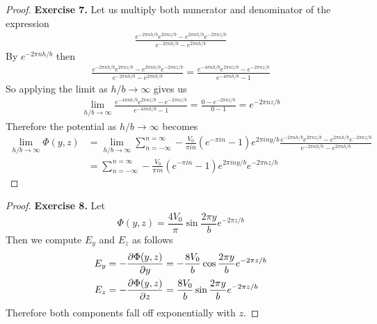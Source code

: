 \documentclass[11pt]{article}
\theoremstyle{definition}
\begin{document}
\cleardoublepage
\begin{proof}{\textbf{Exercise 7.}}
Let us multiply both numerator and denominator of the expression
\begin{align*}
    \frac{e^{-2\pi nh/b}e^{2\pi nz/b} - e^{2\pi nh/b}e^{-2\pi nz/b}}
    {e^{-2\pi nh/b}-e^{2\pi nh/b}}
\end{align*}
By $e^{-2\pi nh/b}$ then
\begin{align*}
    \frac{e^{-2\pi nh/b}e^{2\pi nz/b} - e^{2\pi nh/b}e^{-2\pi nz/b}}
    {e^{-2\pi nh/b}-e^{2\pi nh/b}} = 
    \frac{e^{-4\pi nh/b}e^{2\pi nz/b} - e^{-2\pi nz/b}}
    {e^{-4\pi nh/b}-1}
\end{align*}
So applying the limit as $h/b \to \infty$ gives us
\begin{align*}
    \lim_{h/b \to \infty} 
    \frac{e^{-4\pi nh/b}e^{2\pi nz/b} - e^{-2\pi nz/b}}
    {e^{-4\pi nh/b}-1} = \frac{0- e^{-2\pi nz/b}}{0 - 1} = e^{-2\pi nz/b}
\end{align*}
Therefore the potential as $h/b \to \infty$ becomes
\begin{align*}
    \lim_{h/b \to \infty} \Phi(y,z) &= 
    \lim_{h/b \to \infty} \sum_{n=-\infty}^{n=\infty}
    -\frac{V_0}{\pi i n}(e^{-\pi i n} - 1)e^{2\pi iny/b}
    \frac{e^{-2\pi nh/b}e^{2\pi nz/b} - e^{2\pi nh/b}e^{-2\pi nz/b}}
    {e^{-2\pi nh/b}-e^{2\pi nh/b}}\\
    &= \sum_{n=-\infty}^{n=\infty}
    -\frac{V_0}{\pi i n}(e^{-\pi i n} - 1)e^{2\pi iny/b}e^{-2\pi nz/b}
\end{align*}
\end{proof}
\begin{proof}{\textbf{Exercise 8.}}
    Let
    $$\Phi(y,z) = \frac{4V_0}{\pi}\sin\frac{2\pi y}{b}e^{-2\pi z/b}$$
    Then we compute $E_y$ and $E_z$ as follows
    \begin{align*}
        E_y &= -\pdv{\Phi(y,z)}{y}
        = -\frac{8V_0}{b}\cos\frac{2\pi y}{b}e^{-2\pi z/b}\\
        E_z &= -\pdv{\Phi(y,z)}{z}
        = \frac{8V_0}{b}\sin\frac{2\pi y}{b}e^{-2\pi z/b}
    \end{align*}
    Therefore both components fall off exponentially with $z$.
\end{proof}
\end{document}
